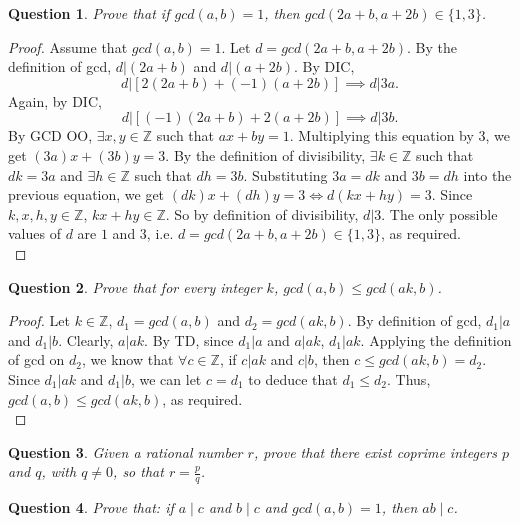 \documentclass[11pt,oneside]{article}
\newtheorem{question}{Question}
\begin{document}
\clearpage

\begin{question}
	Prove that if $gcd(a, b) = 1$, then $gcd(2a + b, a + 2b) \in \{1, 3\}$.
\end{question}

\begin{proof}
	Assume that $gcd(a, b) = 1$.
	Let $d=gcd(2a + b, a + 2b)$. By the definition of gcd, $d|(2a+b)$ and $d|(a+2b)$.
	By DIC, $$d|[2(2a+b) + (-1)(a+2b)] \implies d | 3a.$$
	Again, by DIC, $$d|[(-1)(2a+b) + 2(a+2b)] \implies d | 3b.$$
	By GCD OO, $\exists x,y\in\mathbb{Z}$ such that $ax+by=1$. Multiplying this equation by 3, we get $(3a)x + (3b)y = 3$. By the definition of divisibility, $\exists k\in\mathbb{Z}$ such that $dk = 3a$ and $\exists h\in\mathbb{Z}$ such that $dh = 3b$. Substituting $3a = dk$ and $3b = dh$ into the previous equation, we get $(dk)x + (dh)y = 3 \iff d(kx+hy) = 3$. Since $k,x,h,y \in \mathbb{Z}$, $kx+hy \in \mathbb{Z}$. So by definition of divisibility, $d|3$. The only possible values of $d$ are $1$ and $3$, i.e. $d = gcd(2a + b, a + 2b) \in \{1, 3\}$, as required.\\
\end{proof}

\begin{question}
	Prove that for every integer $k$, $gcd(a, b) \leq gcd(ak, b)$.
\end{question}

\begin{proof}
	Let $k\in\mathbb{Z}$, $d_1=gcd(a, b)$ and $d_2=gcd(ak, b)$. By definition of gcd, $d_1|a$ and $d_1|b$. Clearly, $a|ak$. By TD, since $d_1|a$ and $a|ak$, $d_1|ak$. Applying the definition of gcd on $d_2$, we know that $\forall c\in\mathbb{Z}$, if $c|ak$ and $c|b$, then $c \leq gcd(ak, b) = d_2$. Since $d_1|ak$ and $d_1|b$, we can let $c = d_1$ to deduce that $d_1 \leq d_2$. Thus, $gcd(a, b) \leq gcd(ak, b)$, as required.\\
\end{proof}

\begin{question}
	Given a rational number $r$, prove that there exist coprime integers $p$ and $q$, with $q \neq 0$, so that $r = \frac{p}{q}$.
\end{question}

\bigskip

\begin{question}
	Prove that: if $a \mid c$ and $b \mid c$ and $gcd(a, b) = 1$, then $ab \mid c$.
\end{question}
\end{document}
